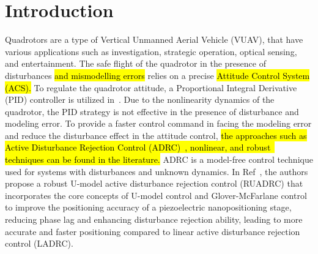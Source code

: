 \documentclass[3p]{elsarticle}
\begin{document}
\section{Introduction}\label{sec:intro}

\noindent Quadrotors are a type of Vertical Unmanned Aerial Vehicle (VUAV), that have various applications such as investigation, strategic operation, optical sensing, and entertainment. The safe flight of the quadrotor in the presence of disturbances \hl{and mismodelling errors} relies on a precise \hl{Attitude Control System (ACS).} To regulate the quadrotor attitude, a Proportional Integral Derivative (PID) controller is utilized in~\mbox{\cite{article_Abdul, article_Bolandi}}. Due to the nonlinearity dynamics of the quadrotor, the PID strategy is not effective in the presence of disturbance and modeling error.
To provide a faster control command in facing the modeling error and reduce the disturbance effect in the attitude control, \hl{the approaches such as Active Disturbance Rejection Control (ADRC)~{\cite{CHENG2023}}, nonlinear, and robust~\mbox{\cite{DING2022580, CORTESROMERO202063}}
 techniques can be found in the literature.} ADRC is a model-free control technique used for systems with disturbances and unknown dynamics. In Ref~\cite{WEI2022599}, the authors propose a robust U-model active disturbance rejection control (RUADRC) that incorporates the core concepts of U-model control and Glover-McFarlane control to improve the positioning accuracy of a piezoelectric nanopositioning stage, reducing phase lag and enhancing disturbance rejection ability, leading to more accurate and faster positioning compared to linear active disturbance rejection control (LADRC). 
\end{document}
